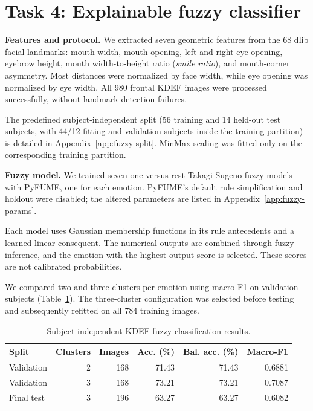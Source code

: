 
\section{Task 4: Explainable fuzzy classifier}
\label{sec:fuzzy}

\textbf{Features and protocol.}
We extracted seven geometric features from the 68 dlib facial
landmarks: mouth width, mouth opening, left and right eye opening,
eyebrow height, mouth width-to-height ratio (\emph{smile ratio}),
and mouth-corner asymmetry. Most distances were normalized by face
width, while eye opening was normalized by eye width. All 980
frontal KDEF images were processed successfully, without landmark
detection failures.

The predefined subject-independent split (56 training and 14 held-out test subjects, with 44/12 fitting and validation subjects inside the training partition) is detailed in Appendix~\ref{app:fuzzy-split}. MinMax scaling was fitted only on the corresponding training partition.

\textbf{Fuzzy model.}
We trained seven one-versus-rest Takagi-Sugeno fuzzy models with
PyFUME, one for each emotion. PyFUME's default rule simplification and holdout were disabled; the altered parameters are listed in Appendix~\ref{app:fuzzy-params}.

Each model uses Gaussian membership
functions in its rule antecedents and a learned linear consequent.
The numerical outputs are combined through fuzzy inference, and
the emotion with the highest output score is selected. These
scores are not calibrated probabilities.

We compared two and three clusters per emotion using macro-F1
on validation subjects (Table~\ref{tab:fuzzy-results}). The three-cluster configuration was
selected before testing and subsequently refitted on all 784
training images.

\begin{table}[htbp]
\centering
\caption{Subject-independent KDEF fuzzy classification results.}
\label{tab:fuzzy-results}
\small
\begin{tabular}{lrrrrr}
\toprule
Split & Clusters & Images & Acc. (\%) & Bal. acc. (\%) & Macro-F1 \\
\midrule
Validation & 2 & 168 & 71.43 & 71.43 & 0.6881 \\
Validation & 3 & 168 & 73.21 & 73.21 & 0.7087 \\
Final test & 3 & 196 & 63.27 & 63.27 & 0.6082 \\
\bottomrule
\end{tabular}
\end{table}

